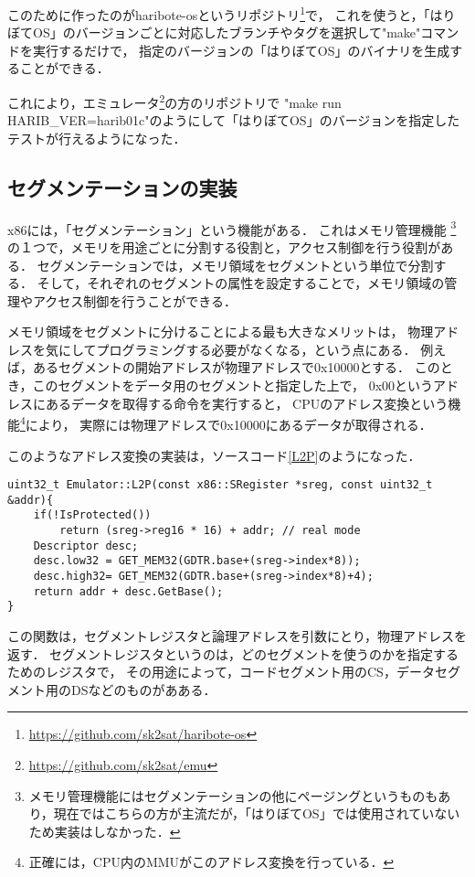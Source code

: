 \documentclass[10pt,a4j]{jsarticle}
\begin{document}
このために作ったのがharibote-osというリポジトリ\footnote{\url{https://github.com/sk2sat/haribote-os}}で，
これを使うと，「はりぼてOS」のバージョンごとに対応したブランチやタグを選択して"make"コマンドを実行するだけで，
指定のバージョンの「はりぼてOS」のバイナリを生成することができる．

これにより，エミュレータ\footnote{\url{https://github.com/sk2sat/emu}}の方のリポジトリで
"make run HARIB\_VER=harib01c"のようにして「はりぼてOS」のバージョンを指定したテストが行えるようになった．

\subsection{セグメンテーションの実装\label{impl-segmentation}}

x86には，「セグメンテーション」という機能がある．
これはメモリ管理機能
\footnote{メモリ管理機能にはセグメンテーションの他にページングというものもあり，現在ではこちらの方が主流だが，「はりぼてOS」では使用されていないため実装はしなかった．}
の１つで，メモリを用途ごとに分割する役割と，アクセス制御を行う役割がある．
セグメンテーションでは，メモリ領域をセグメントという単位で分割する．
そして，それぞれのセグメントの属性を設定することで，メモリ領域の管理やアクセス制御を行うことができる．

メモリ領域をセグメントに分けることによる最も大きなメリットは，
物理アドレスを気にしてプログラミングする必要がなくなる，という点にある．
例えば，あるセグメントの開始アドレスが物理アドレスで0x10000とする．
このとき，このセグメントをデータ用のセグメントと指定した上で，
0x00というアドレスにあるデータを取得する命令を実行すると，
CPUのアドレス変換という機能\footnote{正確には，CPU内のMMUがこのアドレス変換を行っている．}により，
実際には物理アドレスで0x10000にあるデータが取得される．

このようなアドレス変換の実装は，ソースコード\ref{L2P}のようになった．
\begin{lstlisting}[caption=論理アドレスの物理アドレスへの変換,label=L2P]
uint32_t Emulator::L2P(const x86::SRegister *sreg, const uint32_t &addr){
	if(!IsProtected())
		return (sreg->reg16 * 16) + addr; // real mode
	Descriptor desc;
	desc.low32 = GET_MEM32(GDTR.base+(sreg->index*8));
	desc.high32= GET_MEM32(GDTR.base+(sreg->index*8)+4);
	return addr + desc.GetBase();
}
\end{lstlisting}
この関数は，セグメントレジスタと論理アドレスを引数にとり，物理アドレスを返す．
セグメントレジスタというのは，どのセグメントを使うのかを指定するためのレジスタで，
その用途によって，コードセグメント用のCS，データセグメント用のDSなどのものがあある．
\end{document}
